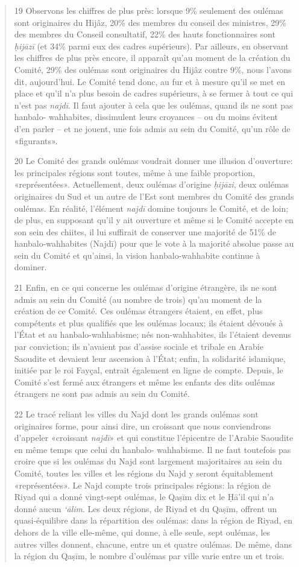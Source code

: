 \begin{quote}
19 Observons les chiffres de plus près: lorsque 9\% seulement des
oulémas sont originaires du Hijâz, 20\% des membres du conseil des
ministres, 29\% des membres du Conseil consultatif, 22\% des hauts
fonctionnaires sont \emph{ḥijāzī} (et 34\% parmi eux des cadres
supérieurs). Par ailleurs, en observant les chiffres de plus près
encore, il apparaît qu'au moment de la création du Comité, 29\% des
oulémas sont originaires du Hijâz contre 9\%, nous l'avons dit,
aujourd'hui. Le Comité tend donc, au fur et à mesure qu'il se met en
place et qu'il n'a plus besoin de cadres supérieurs, à se fermer à tout
ce qui n'est pas \emph{najdī}. Il faut ajouter à cela que les oulémas,
quand ils ne sont pas hanbalo- wahhabites, dissimulent leurs croyances
-- ou du moins évitent d'en parler -- et ne jouent, une fois admis au
sein du Comité, qu'un rôle de «figurants».

20 Le Comité des grands oulémas voudrait donner une illusion
d'ouverture: les principales régions sont toutes, même à une faible
proportion, «représentées». Actuellement, deux oulémas d'origine
\emph{ḥijāzi}, deux oulémas originaires du Sud et un autre de l'Est sont
membres du Comité des grands oulémas. En réalité, l'élément \emph{najdī}
domine toujours le Comité, et de loin; de plus, en supposant qu'il y ait
ouverture et même si le Comité accepte en son sein des chiites, il lui
suffirait de conserver une majorité de 51\% de hanbalo-wahhabites
(Najdī) pour que le vote à la majorité absolue passe au sein du Comité
et qu'ainsi, la vision hanbalo-wahhabite continue à dominer.

21 Enfin, en ce qui concerne les oulémas d'origine étrangère, ils ne
sont admis au sein du Comité (au nombre de trois) qu'au moment de la
création de ce Comité. Ces oulémas étrangers étaient, en effet, plus
compétents et plus qualifiés que les oulémas locaux; ils étaient dévoués
à l'État et au hanbalo-wahhabisme; nés non-wahhabites, ils l'étaient
devenus par conviction; ils n'avaient pas d'assise sociale et tribale en
Arabie Saoudite et devaient leur ascension à l'État; enfin, la
solidarité islamique, initiée par le roi Fayçal, entrait également en
ligne de compte. Depuis, le Comité s'est fermé aux étrangers et même les
enfants des dits oulémas étrangers ne sont pas admis au sein du Comité.

22 Le tracé reliant les villes du Najd dont les grands oulémas sont
originaires forme,
pour ainsi dire, un croissant que nous conviendrons d'appeler «croissant
\emph{najdī}» et qui constitue l'épicentre de l'Arabie Saoudite en même
temps que celui du hanbalo- wahhabisme. Il ne faut toutefois pas croire
que si les oulémas du Najd sont largement majoritaires au sein du
Comité, toutes les villes et les régions du Najd y seront équitablement
«représentées». Le Najd compte trois principales régions: la région de
Riyad qui a donné vingt-sept oulémas, le Qaṣīm dix et le Ḥā'il qui n'a
donné aucun \emph{`ālim}. Les deux régions, de Riyad et du Qaṣīm,
offrent un quasi-équilibre dans la répartition des oulémas: dans la
région de Riyad, en dehors de la ville elle-même, qui donne, à elle
seule, sept oulémas, les autres villes donnent, chacune, entre un et
quatre oulémas. De même, dans la région du Qaṣīm, le nombre d'oulémas
par ville varie entre un et trois.


\end{quote}
